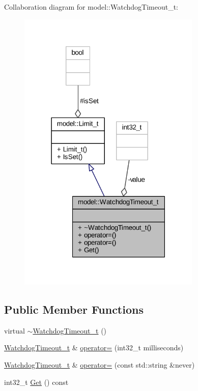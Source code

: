 Collaboration diagram for model\+:\+:Watchdog\+Timeout\+\_\+t\+:
\nopagebreak
\begin{figure}[H]
\begin{center}
\leavevmode
\includegraphics[width=247pt]{classmodel_1_1_watchdog_timeout__t__coll__graph}
\end{center}
\end{figure}
\subsection*{Public Member Functions}
\begin{DoxyCompactItemize}
\item 
virtual \hyperlink{classmodel_1_1_watchdog_timeout__t_a16cc99c635963a743aab0753b6978b34}{$\sim$\+Watchdog\+Timeout\+\_\+t} ()
\item 
\hyperlink{classmodel_1_1_watchdog_timeout__t}{Watchdog\+Timeout\+\_\+t} \& \hyperlink{classmodel_1_1_watchdog_timeout__t_a4400125d1da1aad7ae9b2beff1d11bf2}{operator=} (int32\+\_\+t milliseconds)
\item 
\hyperlink{classmodel_1_1_watchdog_timeout__t}{Watchdog\+Timeout\+\_\+t} \& \hyperlink{classmodel_1_1_watchdog_timeout__t_ab5207189648f5da5faee7aab4607b906}{operator=} (const std\+::string \&never)
\item 
int32\+\_\+t \hyperlink{classmodel_1_1_watchdog_timeout__t_a4cb9de23c2305c8252af6ed91821b867}{Get} () const 
\end{DoxyCompactItemize}
